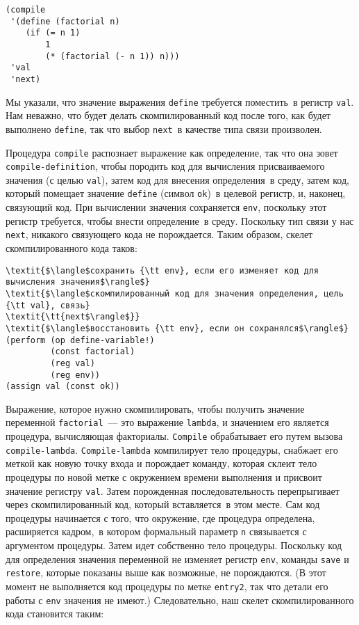 \begin{Verbatim}[fontsize=\small]
(compile
 '(define (factorial n)
    (if (= n 1)
        1
        (* (factorial (- n 1)) n)))
 'val
 'next)
\end{Verbatim}
Мы указали, что значение выражения {\tt define} требуется
поместить~в регистр {\tt val}.  Нам неважно, что будет делать
скомпилированный код после того, как будет выполнено
{\tt define}, так что выбор {\tt next}~в качестве типа связи
произволен.

Процедура {\tt compile} распознает выражение как
определение, так что она зовет {\tt compile-definition}, чтобы
породить код для вычисления присваиваемого значения (с целью
{\tt val}), затем код для внесения определения~в среду,
затем код, который помещает значение {\tt define} (символ
{\tt ok})~в целевой регистр, и, наконец, связующий код.  При
вычислении значения сохраняется {\tt env}, поскольку этот
регистр требуется, чтобы внести определение~в среду.  Поскольку тип
связи у нас {\tt next}, никакого связующего кода не
порождается.  Таким образом, скелет скомпилированного кода таков:

\begin{Verbatim}[fontsize=\small]
\textit{$\langle$сохранить {\tt env}, если его изменяет код для вычисления значения$\rangle$}
\textit{$\langle$скомпилированный код для значения определения, цель {\tt val}, связь}
\textit{\tt{next$\rangle$}}
\textit{$\langle$восстановить {\tt env}, если он сохранялся$\rangle$}
(perform (op define-variable!)
         (const factorial)
         (reg val)
         (reg env))
(assign val (const ok))
\end{Verbatim}

Выражение, которое нужно скомпилировать, чтобы получить
значение переменной {\tt factorial}~--- это выражение
{\tt lambda}, и значением его является процедура,
вычисляющая факториалы. {\tt Compile} обрабатывает его путем
вызова {\tt compile-lambda}.  {\tt Compile-lambda}
компилирует тело процедуры,  снабжает его меткой как новую точку
входа и порождает команду, которая склеит тело процедуры по новой
метке с окружением времени выполнения и присвоит значение регистру
{\tt val}.  Затем порожденная последовательность перепрыгивает
через скомпилированный код, который вставляется~в этом месте.  Сам код
процедуры начинается с того, что окружение, где процедура определена,
расширяется кадром,~в котором формальный параметр {\tt n}
связывается с аргументом процедуры.  Затем идет собственно тело
процедуры.  Поскольку код для определения значения переменной не
изменяет регистр {\tt env}, команды {\tt save} и
{\tt restore}, которые показаны выше как возможные, не
порождаются.  (В этот момент не выполняется код процедуры по метке
{\tt entry2}, так что детали его работы с {\tt env}
значения не имеют.)  Следовательно, наш скелет скомпилированного кода
становится таким:

